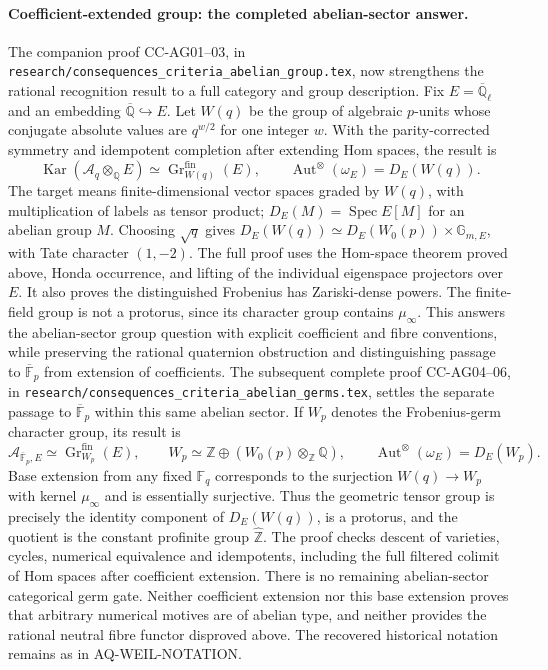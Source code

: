 \paragraph{Coefficient-extended group: the completed abelian-sector answer.}
The companion proof CC-AG01--03, in
\texttt{research/consequences\_criteria\_abelian\_group.tex},
now strengthens the rational recognition result to a full
category and group description. Fix
$E=\overline{\mathbb Q}_\ell$ and an embedding
$\overline{\mathbb Q}\hookrightarrow E$. Let $W(q)$ be the
group of algebraic $p$-units whose conjugate absolute values
are $q^{w/2}$ for one integer $w$. With the parity-corrected
symmetry and idempotent completion after extending Hom spaces,
the result is
\[
 \operatorname{Kar}(\mathcal A_q\otimes_{\mathbb Q}E)
  \simeq \operatorname{Gr}^{\mathrm{fin}}_{W(q)}(E),\qquad
 \operatorname{Aut}^{\otimes}(\omega_E)=D_E(W(q)).
\]
The target means finite-dimensional vector spaces graded by
$W(q)$, with multiplication of labels as tensor product;
$D_E(M)=\operatorname{Spec}E[M]$ for an abelian group $M$.
Choosing $\sqrt q$ gives
$D_E(W(q))\simeq D_E(W_0(p))\times\mathbb G_{m,E}$,
with Tate character $(1,-2)$. The full proof uses the
Hom-space theorem proved above, Honda occurrence, and
lifting of the individual eigenspace projectors over $E$.
It also proves the distinguished Frobenius has Zariski-dense
powers. The finite-field group is not a protorus, since its
character group contains $\mu_\infty$. This answers the
abelian-sector group question with explicit coefficient and
fibre conventions, while preserving the rational quaternion
obstruction and distinguishing passage to
$\overline{\mathbb F}_p$ from extension of coefficients.
The subsequent complete proof CC-AG04--06, in
\texttt{research/consequences\_criteria\_abelian\_germs.tex},
settles the separate passage to $\overline{\mathbb F}_p$
within this same abelian sector. If $W_p$ denotes the
Frobenius-germ character group, its result is
\[
 \mathcal A_{\overline{\mathbb F}_p,E}
  \simeq\operatorname{Gr}^{\mathrm{fin}}_{W_p}(E),\qquad
 W_p\simeq\mathbb Z\oplus(W_0(p)\otimes_{\mathbb Z}\mathbb Q),
 \qquad\operatorname{Aut}^{\otimes}(\omega_E)=D_E(W_p).
\]
Base extension from any fixed $\mathbb F_q$ corresponds to the
surjection $W(q)\to W_p$ with kernel $\mu_\infty$ and is
essentially surjective. Thus the geometric tensor group is
precisely the identity component of $D_E(W(q))$, is a protorus,
and the quotient is the constant profinite group
$\widehat{\mathbb Z}$. The proof checks descent of varieties,
cycles, numerical equivalence and idempotents, including the
full filtered colimit of Hom spaces after coefficient extension.
There is no remaining abelian-sector categorical germ gate.
Neither coefficient extension nor this base extension proves
that arbitrary numerical motives are of abelian type, and
neither provides the rational neutral fibre functor disproved
above. The recovered historical notation remains as in
AQ-WEIL-NOTATION.

